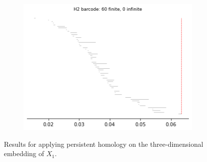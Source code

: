 \begin{figure}[H]
\begin{subfigure}[b]{0.24\textwidth}
\includegraphics[width=\textwidth]{figures/X1_H2_barcode.png}
 \caption{}
\end{subfigure}
\caption{Results for applying persistent homology on the three-dimensional embedding of $X_1$.}
\end{figure}

